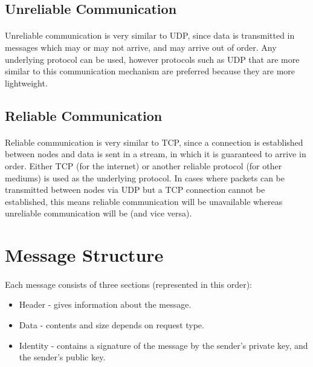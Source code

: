 \documentclass{article}
\begin{document}
\subsection{Unreliable Communication}

\paragraph{}
Unreliable communication is very similar to UDP, since data is transmitted in messages which may or may not arrive, and may arrive out of order. Any underlying protocol can be used, however protocols such as UDP that are more similar to this communication mechanism are preferred because they are more lightweight.

\subsection{Reliable Communication}

\paragraph{}
Reliable communication is very similar to TCP, since a connection is established between nodes and data is sent in a stream, in which it is guaranteed to arrive in order. Either TCP (for the internet) or another reliable protocol (for other mediums) is used as the underlying protocol. In cases where packets can be transmitted between nodes via UDP but a TCP connection cannot be established, this means reliable communication will be unavailable whereas unreliable communication will be (and vice versa).

\section{Message Structure}

\paragraph{}
Each message consists of three sections (represented in this order):

\begin{itemize}
\item Header - gives information about the message.
\item Data - contents and size depends on request type.
\item Identity - contains a signature of the message by the sender's private key, and the sender's public key.
\end{itemize}
\end{document}
